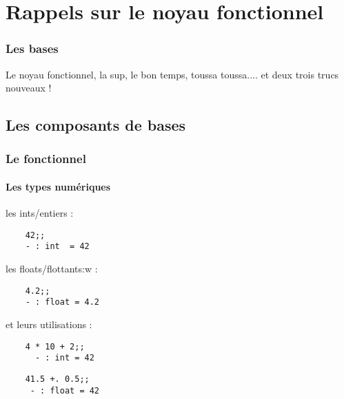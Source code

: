 \section{Rappels sur le noyau fonctionnel}
\begin{frame}
  \begin{center}
    \frametitle{Les bases}
  Le noyau fonctionnel, la sup, le bon temps, toussa toussa.... et deux trois trucs nouveaux !
  \end{center}
\end{frame}

\subsection{Les composants de bases}

\begin{frame}[fragile]
  \frametitle{Le fonctionnel}
  \framesubtitle{Les types numériques}
   \begin{minipage}[t]{5cm}
    les ints/entiers : 
    \begin{lstlisting}
    42;;
    - : int  = 42
    \end{lstlisting}
   \end{minipage}
   \begin{minipage}[t]{5cm}
    les floats/flottants:w :
    \begin{lstlisting}
    4.2;;
    - : float = 4.2
    \end{lstlisting}
   \end{minipage}
   \vspace{0.5cm}
    et leurs utilisations :\\
   \begin{minipage}[t]{5cm}
     \begin{lstlisting}
    4 * 10 + 2;;
      - : int = 42
     \end{lstlisting}
   \end{minipage}
   \begin{minipage}[t]{5cm}
     \begin{lstlisting}
    41.5 +. 0.5;;
     - : float = 42
     \end{lstlisting}
   \end{minipage}
\end{frame}

